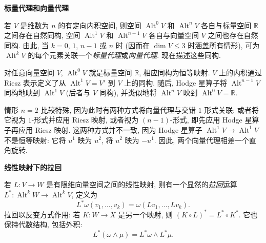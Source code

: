 \medskip\noindent\textbf{{标量代理和向量代理}}\par
{若 $V$ 是维数为 $n$ 的有定向内积空间, 则空间 $\operatorname{Alt}^0V$ 和 $\operatorname{Alt}^nV$ 各自与标量空间 $\mathbb R$ 之间存在自然同构, 空间 $\operatorname{Alt}^1V$ 和 $\operatorname{Alt}^{n-1}V$ 各自与向量空间 $V$ 之间也存在自然同构. 由此, 当 $k=0$, $1$, $n-1$ 或 $n$ 时 (因而在 $\dim V\leq3$ 时涵盖所有情形), 可为 $\operatorname{Alt}^kV$ 的每个元素关联一个\emph{标量代理}或\emph{向量代理}. 现在描述这些同构.}

{对任意向量空间 $V$, $\operatorname{Alt}^0V$ 就是标量空间 $\mathbb R$, 相应同构为恒等映射. $V$ 上的内积通过 Riesz 表示定义了从 $\operatorname{Alt}^1V=V'$ 到 $V$ 上的同构. 随后, Hodge 星算子将 $\operatorname{Alt}^{n-1}V$ 同构地映到 $\operatorname{Alt}^1V$ (后者与 $V$ 同构), 并类似地将 $\operatorname{Alt}^nV$ 映到 $\operatorname{Alt}^0V=\mathbb R$.}

{情形 $n=2$ 比较特殊, 因为此时有两种方式将向量代理与交错 $1$-形式关联: 或者将它视为 $1$-形式并应用 Riesz 映射, 或者视为 $(n-1)$-形式, 即先应用 Hodge 星算子再应用 Riesz 映射. 这两种方式并不一致, 因为 Hodge 星算子 $\operatorname{Alt}^1V\to\operatorname{Alt}^1V$ 不是恒等映射: 它将 $u^1$ 映为 $u^2$, 将 $u^2$ 映为 $-u^1$. 因此, 两个向量代理相差一个直角旋转.}

\medskip\noindent\textbf{{线性映射下的拉回}}\par
{若 $L:V\to W$ 是有限维向量空间之间的线性映射, 则有一个显然的\emph{拉回}运算 $L^*:\operatorname{Alt}^kW\to\operatorname{Alt}^kV$, 定义为}
\begin{equation}\label{eq:linear-pullback-definition}
L^*\omega(v_1,\ldots,v_k)=\omega(Lv_1,\ldots,Lv_k).
\end{equation}
{拉回以反变方式作用: 若 $K:W\to X$ 是另一个映射, 则 $(K\circ L)^*=L^*\circ K^*$. 它也保持代数结构, 包括外积:}
\begin{equation}\label{eq:linear-pullback-wedge}
L^*(\omega\wedge\mu)=L^*\omega\wedge L^*\mu.
\end{equation}


